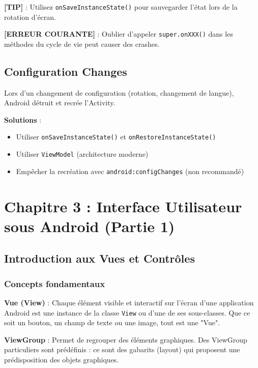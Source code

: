 \documentclass[11pt,a4paper]{article}
\begin{document}
\textbf{[TIP]} : Utilisez \texttt{onSaveInstanceState()} pour sauvegarder l'état lors de la rotation d'écran.

\textbf{[ERREUR COURANTE]} : Oublier d'appeler \texttt{super.onXXX()} dans les méthodes du cycle de vie peut causer des crashes.

\subsection{Configuration Changes}

Lors d'un changement de configuration (rotation, changement de langue), Android détruit et recrée l'Activity.

\textbf{Solutions} :
\begin{itemize}
    \item Utiliser \texttt{onSaveInstanceState()} et \texttt{onRestoreInstanceState()}
    \item Utiliser \texttt{ViewModel} (architecture moderne)
    \item Empêcher la recréation avec \texttt{android:configChanges} (non recommandé)
\end{itemize}


\section{Chapitre 3 : Interface Utilisateur sous Android (Partie 1)}

\subsection{Introduction aux Vues et Contrôles}

\subsubsection{Concepts fondamentaux}

\textbf{Vue (View)} : Chaque élément visible et interactif sur l'écran d'une application Android est une instance de la classe \texttt{View} ou d'une de ses sous-classes. Que ce soit un bouton, un champ de texte ou une image, tout est une "Vue".

\textbf{ViewGroup} : Permet de regrouper des éléments graphiques. Des ViewGroup particuliers sont prédéfinis : ce sont des gabarits (layout) qui proposent une prédisposition des objets graphiques.
\end{document}
